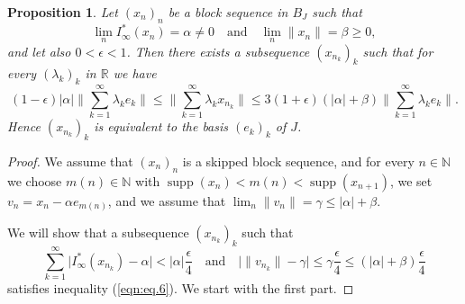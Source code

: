 \documentclass[12pt]{amsart}
\theoremstyle{plain}
\numberwithin{equation}{section}
\newcommand{\N}{\mathbb{N}}
\newcommand{\R}{\mathbb{R}}
\DeclareMathOperator{\supp}{supp}
\newtheorem{proposition}[theorem]{Proposition}
\begin{document}
\begin{proposition}\label{P10}
Let $(x_n)_n$ be a block sequence in $B_J$ such that
\[ \lim_n I_\infty^*(x_n) = \alpha \neq 0 \quad \text{and} \quad \lim_n \|x_n\| =\beta \geq 0,\]
and let also $0< \epsilon < 1$. Then there exists a subsequence $(x_{n_k})_k$ such that for every $(\lambda_k)_k$ in $\R$ we have
\begin{equation}\label{eqn:eq.6}
(1-\epsilon) |\alpha|\Big\| \sum_{k=1}^\infty \lambda_k e_k \Big\| \leq \Big\| \sum_{k=1}^\infty \lambda_k x_{n_k} \Big\| \leq 3(1+\epsilon)(|\alpha|+ \beta)\Big\| \sum_{k=1}^\infty \lambda_k e_k \Big\|.
\end{equation}
Hence $(x_{n_k})_k$ is equivalent to the basis $(e_k)_k$ of $J$.
\end{proposition}
\begin{proof}
We assume that $(x_n)_n$ is a skipped block sequence, and for every $n\in \N$ we choose $m(n) \in \N$ with $\supp(x_n) < m(n) < \supp(x_{n+1})$, we set $v_n = x_n - \alpha e_{m(n)}$, and we assume that
$\lim_n \|v_n\| = \gamma \leq |\alpha| + \beta$.

We will show that a subsequence $(x_{n_k})_k$ such that
\begin{equation}\label{eqn:eq.7}
\sum_{k=1}^\infty \Big| I_\infty^*(x_{n_k}) - \alpha \Big| < |\alpha| \frac{\epsilon}{4} \quad \text{and} \quad
\Big| \|v_{n_k}\| - \gamma \Big| \leq \gamma\frac{\epsilon}{4} \leq (|\alpha| + \beta) \frac{\epsilon}{4}
\end{equation}
satisfies inequality (\ref{eqn:eq.6}). We start with the first part.


\end{proof}
\end{document}
